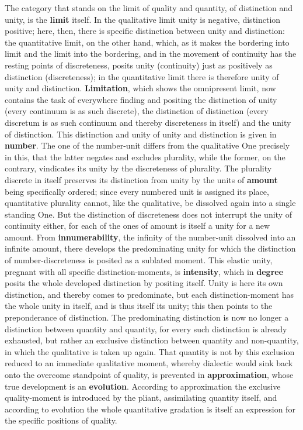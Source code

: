 \documentclass[12pt,a4paper,openany]{book}
\newcommand{\opage}[1]{\marginnote{\footnotesize\textit{[#1]}}}
\begin{document}
The category that stands on the limit of quality and quantity, of distinction and unity, is the \textbf{limit} itself. In the qualitative limit unity is negative, distinction positive; here, then, there is specific distinction between unity and distinction: the quantitative limit,
\setcounter{footnote}{0}%
\opage{74}on the other hand, which, as it makes the bordering into limit and the limit into the bordering, and in the movement of continuity has the resting points of discreteness, posits unity (continuity) just as positively as distinction (discreteness); in the quantitative limit there is therefore unity of unity and distinction. \textbf{Limitation}, which shows the omnipresent limit, now contains the task of everywhere finding and positing the distinction of unity (every continuum is as such discrete), the distinction of distinction (every discretum is as such continuum and thereby discreteness in itself) and the unity of distinction. This distinction and unity of unity and distinction is given in \textbf{number}. The one of the number-unit differs from the qualitative One precisely in this, that the latter negates and excludes plurality, while the former, on the contrary, vindicates its unity by the discreteness of plurality. The plurality discrete in itself preserves its distinction from unity by the units of \textbf{amount} being specifically ordered; since every numbered unit is assigned its place, quantitative plurality cannot, like the qualitative, be dissolved again into a single standing One. But the distinction of discreteness does not interrupt the unity of continuity either, for each of the ones of amount is itself a unity for a new amount. From \textbf{innumerability}, the infinity of the number-unit dissolved into an infinite amount, there develops the predominating unity for which the distinction of number-discreteness is posited as a sublated moment. This elastic unity, pregnant with all specific distinction-moments, is \textbf{intensity}, which in \textbf{degree} posits the whole developed distinction by positing itself. Unity is here its own distinction, and thereby comes to predominate, but each distinction-moment has the whole unity in itself, and is thus itself its unity; this then points to the preponderance of distinction. The predominating
\setcounter{footnote}{0}%
\opage{75}distinction is now no longer a distinction between quantity and quantity, for every such distinction is already exhausted, but rather an exclusive distinction between quantity and non-quantity, in which the qualitative is taken up again. That quantity is not by this exclusion reduced to an immediate qualitative moment, whereby dialectic would sink back onto the overcome standpoint of quality, is prevented in \textbf{approximation}, whose true development is an \textbf{evolution}. According to approximation the exclusive quality-moment is introduced by the pliant, assimilating quantity itself, and according to evolution the whole quantitative gradation is itself an expression for the specific positions of quality.
\end{document}
